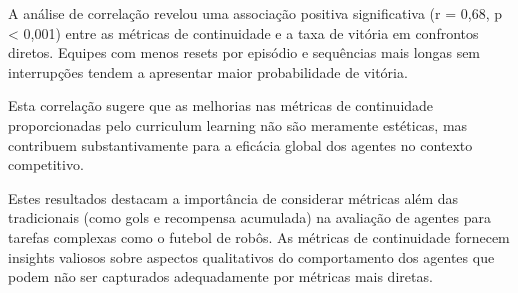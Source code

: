A análise de correlação revelou uma associação positiva significativa (r = 0,68, p < 0,001) entre as métricas de continuidade e a taxa de vitória em confrontos diretos. Equipes com menos resets por episódio e sequências mais longas sem interrupções tendem a apresentar maior probabilidade de vitória.

Esta correlação sugere que as melhorias nas métricas de continuidade proporcionadas pelo curriculum learning não são meramente estéticas, mas contribuem substantivamente para a eficácia global dos agentes no contexto competitivo.

Estes resultados destacam a importância de considerar métricas além das tradicionais (como gols e recompensa acumulada) na avaliação de agentes para tarefas complexas como o futebol de robôs. As métricas de continuidade fornecem insights valiosos sobre aspectos qualitativos do comportamento dos agentes que podem não ser capturados adequadamente por métricas mais diretas. 